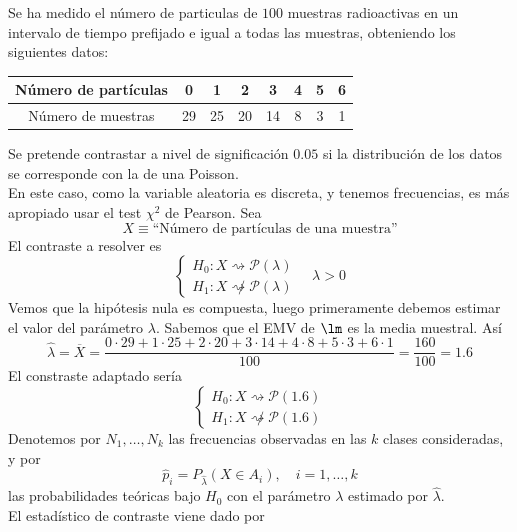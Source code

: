 \documentclass[12pt]{article}
\begin{document}
    \begin{ejercicio}[1 punto]
        Se ha medido el número de particulas de $100$ muestras radioactivas en un intervalo de tiempo prefijado e igual a todas las muestras, obteniendo los siguientes datos:
        \begin{table}[H]
        \centering
        \begin{tabular}{c|ccccccc}
            Número de partículas & 0 & 1 & 2 & 3 & 4 & 5 & 6 \\
            \hline
            Número de muestras & 29 & 25 & 20 & 14 & 8 & 3 & 1
        \end{tabular}
        \end{table}
        \noindent
        Se pretende contrastar a nivel de significación $0.05$ si la distribución de los datos se corresponde con la de una Poisson. \\
    
        En este caso, como la variable aleatoria es discreta, y tenemos frecuencias, es más apropiado usar el test $\chi^2$ de Pearson.
        Sea $$X \equiv \text{``Número de partículas de una muestra''}$$ El contraste a resolver es
        $$\begin{cases}
            H_0 : X \rightsquigarrow \mathcal{P}(\lambda) \\
            H_1 : X \not\rightsquigarrow \mathcal{P}(\lambda)
        \end{cases} \quad \lambda > 0$$
        Vemos que la hipótesis nula es compuesta, luego primeramente debemos estimar el valor del parámetro $\lambda$. Sabemos que el EMV de $\lm$ es la media muestral. Así
        $$\hat{\lambda} = \overline{X} = \dfrac{0 \cdot 29 + 1 \cdot 25 + 2 \cdot 20 + 3 \cdot 14 + 4 \cdot 8 + 5 \cdot 3 + 6 \cdot 1}{100} = \dfrac{160}{100} = 1.6$$
        El constraste adaptado sería 
        $$\begin{cases}
            H_0 : X \rightsquigarrow \mathcal{P}(1.6) \\
            H_1 : X \not\rightsquigarrow \mathcal{P}(1.6)
        \end{cases}$$
        Denotemos por $N_1, \ldots, N_k$ las frecuencias observadas en las $k$ clases consideradas, y por
        $$\hat{p}_i = P_{\hat{\lambda}}(X \in A_i), \quad i = 1, \ldots, k$$
        las probabilidades teóricas bajo $H_0$ con el parámetro $\lambda$ estimado por $\hat{\lambda}$. \\

        El estadístico de contraste viene dado por


\end{ejercicio}
\end{document}

